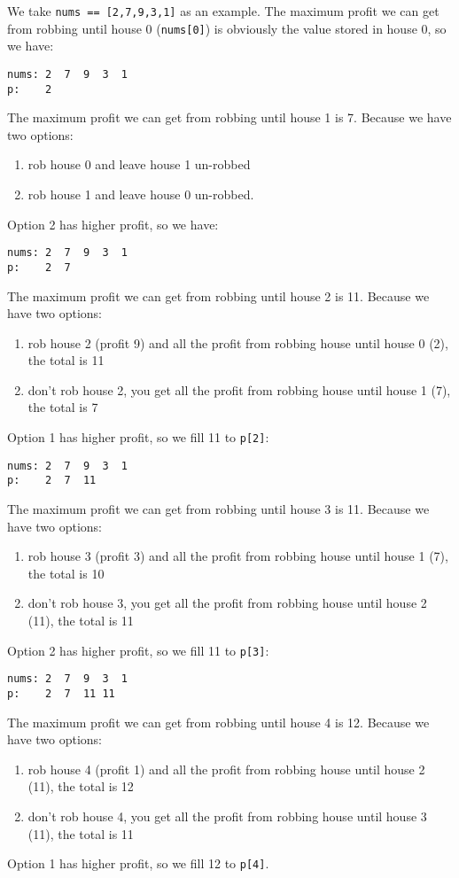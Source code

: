 \documentclass[12pt]{article}
\begin{document}
We take \texttt{nums == [2,7,9,3,1]} as an example. The maximum profit we can get from robbing until house 0 (\texttt{nums[0]}) is obviously the value stored in house 0, so we have:
\begin{verbatim}
nums: 2  7  9  3  1
p:    2
\end{verbatim}
The maximum profit we can get from robbing until house 1 is 7. Because we have two options:
\begin{enumerate}
\item rob house 0 and leave house 1 un-robbed
\item rob house 1 and leave house 0 un-robbed.
\end{enumerate}
Option 2 has higher profit, so we have:
\begin{verbatim}
nums: 2  7  9  3  1
p:    2  7
\end{verbatim}
The maximum profit we can get from robbing until house 2 is 11. Because we have two options:
\begin{enumerate}
\item rob house 2 (profit 9) and all the profit from robbing house until house 0 (2), the total is 11
\item don't rob house 2, you get all the profit from robbing house until house 1 (7), the total is 7
\end{enumerate}
Option 1 has higher profit, so we fill 11 to \texttt{p[2]}:
\begin{verbatim}
nums: 2  7  9  3  1
p:    2  7  11
\end{verbatim}
The maximum profit we can get from robbing until house 3 is 11. Because we have two options:
\begin{enumerate}
\item rob house 3 (profit 3) and all the profit from robbing house until house 1 (7), the total is 10
\item don't rob house 3, you get all the profit from robbing house until house 2 (11), the total is 11
\end{enumerate}
Option 2 has higher profit, so we fill 11 to \texttt{p[3]}:
\begin{verbatim}
nums: 2  7  9  3  1
p:    2  7  11 11
\end{verbatim}
The maximum profit we can get from robbing until house 4 is 12. Because we have two options:
\begin{enumerate}
\item rob house 4 (profit 1) and all the profit from robbing house until house 2 (11), the total is 12
\item don't rob house 4, you get all the profit from robbing house until house 3 (11), the total is 11
\end{enumerate}
Option 1 has higher profit, so we fill 12 to \texttt{p[4]}.
\end{document}
